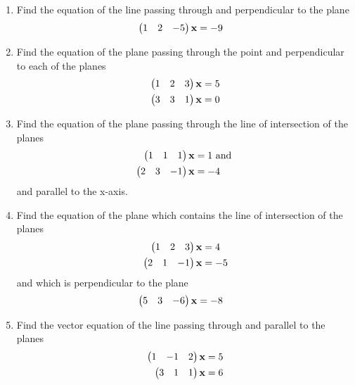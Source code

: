\documentclass[journal,12pt,twocolumn]{IEEEtran}
\renewcommand\thesection{\arabic{section}}
\begin{document}
\begin{enumerate}[label=\thesection.\arabic*.,ref=\thesection.\theenumi]
%
\item Find the  equation of the line passing through  and perpendicular to the plane %
\begin{align}
\begin{pmatrix}1 & 2 & -5\end{pmatrix}\mathbf{x}&=-9
\end{align}
\solution
%
\item Find the equation of the plane passing through the point  and perpendicular to each of the planes 
\begin{align}
\begin{pmatrix}1 & 2 & 3\end{pmatrix}\mathbf{x}&=5
\\
\begin{pmatrix}3 & 3 & 1\end{pmatrix}\mathbf{x}&=0
\end{align}
\item Find the equation of the plane passing through the line of intersection of the planes 
\begin{align}
\begin{pmatrix}1 & 1 & 1\end{pmatrix}\mathbf{x}&=1 \text{ and }
\\
\begin{pmatrix}2 & 3 & -1\end{pmatrix}\mathbf{x}&=-4
\end{align}
%
and parallel to the x-axis.
%
\\
\solution
%
\item Find the equation of the plane which contains the line of intersection of the planes 
%
\begin{align}
\begin{pmatrix}1 & 2 & 3\end{pmatrix}\mathbf{x}&=4 
\\
\begin{pmatrix}2 & 1 & -1\end{pmatrix}\mathbf{x}&=-5
\end{align}
%
and which is perpendicular to the plane 
\begin{align}
\begin{pmatrix}5 & 3 & -6\end{pmatrix}\mathbf{x}&=-8
\end{align}
%
\item Find the vector equation of the line passing through  and parallel to the planes 
%
\begin{align}
\begin{pmatrix}1 & -1 & 2\end{pmatrix}\mathbf{x}&=5
\\
\begin{pmatrix}3 & 1 & 1\end{pmatrix}\mathbf{x}&=6
\end{align}
%
\solution


\end{enumerate}
\end{document}
